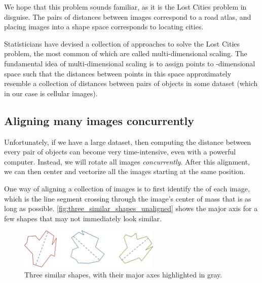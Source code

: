 \begin{note}\end{note}

We hope that this problem sounds familiar, as it is the Lost Cities problem in disguise. The pairs of distances between images correspond to a road atlas, and placing images into a shape space corresponds to locating cities.

Statisticians have devised a collection of approaches to solve the Lost Cities problem, the most common of which are called multi-dimensional scaling. The fundamental idea of multi-dimensional scaling is to assign points to -dimensional space such that the distances between points in this space approximately resemble a collection of distances between pairs of objects in some dataset (which in our case is cellular images).\\

\begin{qbox}\end{qbox}

\FloatBarrier
{}
\subsection{Aligning many images concurrently}

Unfortunately, if we have a large dataset, then computing the distance between every pair of objects can become very time-intensive, even with a powerful computer. Instead, we will rotate all images \textit{concurrently}. After this alignment, we can then center and vectorize all the images starting at the same position.

One way of aligning a collection of images is to first identify the  of each image, which is the line segment crossing through the image's center of mass that is as long as possible. \autoref{fig:three_similar_shapes_unaligned} shows the major axis for a few shapes that may not immediately look similar.

\begin{figure}[h]
\centering
\mySfFamily
\includegraphics[width = 0.6\textwidth]{../images/three_similar_shapes_unaligned.png}
\caption{Three similar shapes, with their major axes highlighted in gray.}
\label{fig:three_similar_shapes_unaligned}
\end{figure}

